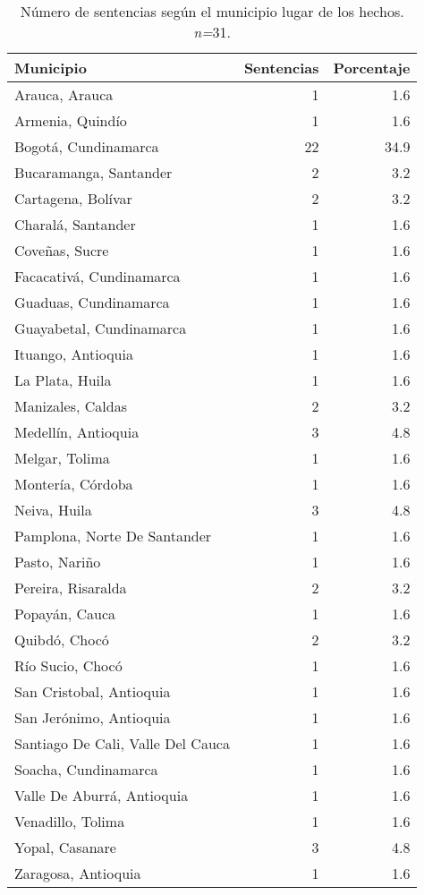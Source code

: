 \begin{table}[!htbp]
\centering
\caption{Número de sentencias según el municipio lugar de los hechos. \textit{n=}31.} 
\label{tab:munhec}
\begin{tabular}{lrr}
  \hline
Municipio & Sentencias & Porcentaje \\ 
  \hline
Arauca, Arauca &  1 & 1.6 \\ 
  Armenia, Quindío &  1 & 1.6 \\ 
  Bogotá, Cundinamarca & 22 & 34.9 \\ 
  Bucaramanga, Santander &  2 & 3.2 \\ 
  Cartagena, Bolívar &  2 & 3.2 \\ 
  Charalá, Santander &  1 & 1.6 \\ 
  Coveñas, Sucre &  1 & 1.6 \\ 
  Facacativá, Cundinamarca &  1 & 1.6 \\ 
  Guaduas, Cundinamarca &  1 & 1.6 \\ 
  Guayabetal, Cundinamarca &  1 & 1.6 \\ 
  Ituango, Antioquia &  1 & 1.6 \\ 
  La Plata, Huila &  1 & 1.6 \\ 
  Manizales, Caldas &  2 & 3.2 \\ 
  Medellín, Antioquia &  3 & 4.8 \\ 
  Melgar, Tolima &  1 & 1.6 \\ 
  Montería, Córdoba &  1 & 1.6 \\ 
  Neiva, Huila &  3 & 4.8 \\ 
  Pamplona, Norte De Santander &  1 & 1.6 \\ 
  Pasto, Nariño &  1 & 1.6 \\ 
  Pereira, Risaralda &  2 & 3.2 \\ 
  Popayán, Cauca &  1 & 1.6 \\ 
  Quibdó, Chocó &  2 & 3.2 \\ 
  Río Sucio, Chocó &  1 & 1.6 \\ 
  San Cristobal, Antioquia &  1 & 1.6 \\ 
  San Jerónimo, Antioquia &  1 & 1.6 \\ 
  Santiago De Cali, Valle Del Cauca &  1 & 1.6 \\ 
  Soacha, Cundinamarca &  1 & 1.6 \\ 
  Valle De Aburrá, Antioquia &  1 & 1.6 \\ 
  Venadillo, Tolima &  1 & 1.6 \\ 
  Yopal, Casanare &  3 & 4.8 \\ 
  Zaragosa, Antioquia &  1 & 1.6 \\ 
   \hline
\end{tabular}
\end{table}
